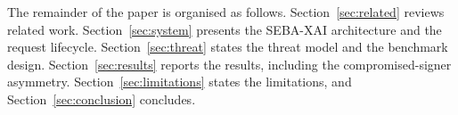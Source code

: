 The remainder of the paper is organised as follows.
Section~\ref{sec:related} reviews related work.
Section~\ref{sec:system} presents the SEBA-XAI architecture and the request
lifecycle. Section~\ref{sec:threat} states the threat model and the benchmark
design. Section~\ref{sec:results} reports the results, including the
compromised-signer asymmetry. Section~\ref{sec:limitations} states the
limitations, and Section~\ref{sec:conclusion} concludes.
